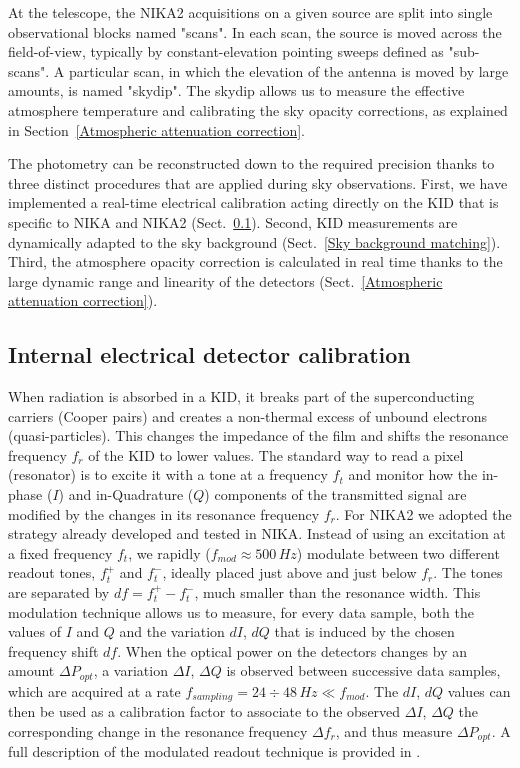 \documentclass[]{aa} %
\begin{document}
At the telescope, the NIKA2 acquisitions on a given source are split into single observational blocks named "scans". In each scan, the source is moved across the field-of-view, typically by constant-elevation pointing sweeps defined as "sub-scans". A particular scan, in which the elevation of the antenna is moved by large amounts, is named "skydip". The skydip allows us to measure the effective atmosphere temperature and calibrating the sky opacity corrections, as explained in Section~\ref{Atmospheric attenuation correction}.

The photometry can be reconstructed down to the required precision thanks to three distinct procedures that are applied during sky observations. First, we have implemented a real-time electrical calibration acting directly on the KID that is specific to NIKA and NIKA2 (Sect.~\ref{Internal detectors calibration}). Second, KID measurements are dynamically adapted to the sky background (Sect.~\ref{Sky background matching}). Third, the atmosphere opacity correction is calculated in real time thanks to the large dynamic range and linearity of the detectors (Sect.~\ref{Atmospheric attenuation correction}).



\subsection{Internal electrical detector calibration}
\label{Internal detectors calibration}

When radiation is absorbed in a KID, it breaks part of the superconducting carriers (Cooper pairs) and creates a non-thermal excess of unbound electrons (quasi-particles). This changes the impedance of the film and shifts the resonance frequency $f_r$ of the KID to lower values.
The standard way to read a pixel (resonator) is to excite it with a tone at a frequency $f_t$ and monitor how the in-phase ($I$) and in-Quadrature ($Q$) components of the transmitted signal are modified by the changes in its resonance frequency $f_r$. For NIKA2 we adopted the strategy already developed and tested in NIKA. Instead of using an excitation at a fixed frequency $f_t$, we rapidly ($f_{mod} \approx 500\,Hz$) modulate between two different readout tones, $f_t^+$ and $f_t^-$, ideally placed just above and just below $f_r$. The tones are separated by $df=f_t^+-f_t^-$, much smaller than the resonance width. This modulation technique allows us to measure, for every data sample, both the values of $I$ and $Q$ and the variation $dI$, $dQ$ that is induced by the chosen frequency shift $df$. When the optical power on the detectors changes by an amount $\Delta P_{opt}$, a variation $\Delta I$, $\Delta Q$ is observed between successive data samples, which are acquired at a rate $f_{sampling} = 24\div48\,Hz \ll  f_{mod} $. The $dI$, $dQ$ values can then be used as a calibration factor to associate to the observed $\Delta I$, $\Delta Q$ the corresponding change in the resonance frequency $\Delta f_r$, and thus measure $\Delta P_{opt}$. A full description of the modulated readout technique is provided in \cite{Calvo2013}.
\end{document}
